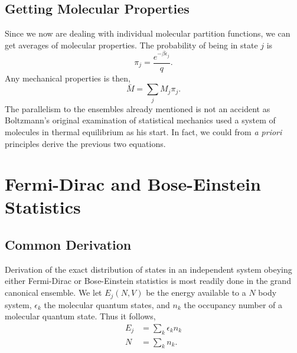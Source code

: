 \subsection{Getting Molecular Properties}
Since we now are dealing with individual molecular partition functions, we can
get averages of molecular properties. The probability of being in state $j$ is
\begin{equation*}
	\pi_j = \frac{e^{-\beta \epsilon_j}}{q}.
\end{equation*}
Any mechanical properties is then,
\begin{equation*}
	\bar{M} = \sum_j{M_j \pi_j}.
\end{equation*}
The parallelism to the ensembles already mentioned is not an accident as
Boltzmann's original examination of statistical mechanics used a system of
molecules in thermal equilibrium as his start. In fact, we could from \textit{a
priori} principles derive the previous two equations.

\section{Fermi-Dirac and Bose-Einstein Statistics}%
\label{sec:Fermi-Dirac and Bose-Einstein Statistics}
\subsection{Common Derivation}
Derivation of the exact distribution of states in an independent system obeying
either Fermi-Dirac or Bose-Einstein statistics is most readily done in the grand
canonical ensemble. We let $E_j(N, V)$ be the energy available to a $N$ body
system, $\epsilon_k$ the molecular quantum states, and $n_k$ the occupancy
number of a molecular quantum state. Thus it follows,
\begin{align*}
	E_j &= \sum_k{\epsilon_k n_k}\\
	N &= \sum_k{n_k}.
\end{align*}

